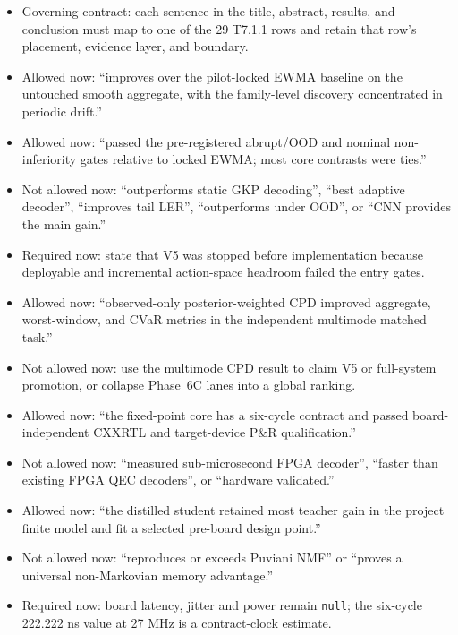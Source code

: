 \documentclass[11pt]{article}
\begin{document}
\begin{itemize}
  \item Governing contract: each sentence in the title, abstract, results, and
  conclusion must map to one of the 29 T7.1.1 rows and retain that row's
  placement, evidence layer, and boundary.
  \item Allowed now: ``improves over the pilot-locked EWMA baseline on the
  untouched smooth aggregate, with the family-level discovery concentrated in
  periodic drift.''
  \item Allowed now: ``passed the pre-registered abrupt/OOD and nominal
  non-inferiority gates relative to locked EWMA; most core contrasts were
  ties.''
  \item Not allowed now: ``outperforms static GKP decoding'', ``best adaptive
  decoder'', ``improves tail LER'', ``outperforms under OOD'', or ``CNN
  provides the main gain.''
  \item Required now: state that V5 was stopped before implementation because
  deployable and incremental action-space headroom failed the entry gates.
  \item Allowed now: ``observed-only posterior-weighted CPD improved aggregate,
  worst-window, and CVaR metrics in the independent multimode matched task.''
  \item Not allowed now: use the multimode CPD result to claim V5 or full-system
  promotion, or collapse Phase~6C lanes into a global ranking.
  \item Allowed now: ``the fixed-point core has a six-cycle contract and passed
  board-independent CXXRTL and target-device P\&R qualification.''
  \item Not allowed now: ``measured sub-microsecond FPGA decoder'', ``faster
  than existing FPGA QEC decoders'', or ``hardware validated.''
  \item Allowed now: ``the distilled student retained most teacher gain in the
  project finite model and fit a selected pre-board design point.''
  \item Not allowed now: ``reproduces or exceeds Puviani NMF'' or ``proves a
  universal non-Markovian memory advantage.''
  \item Required now: board latency, jitter and power remain \texttt{null}; the
  six-cycle 222.222 ns value at 27 MHz is a contract-clock estimate.
\end{itemize}



\end{document}
